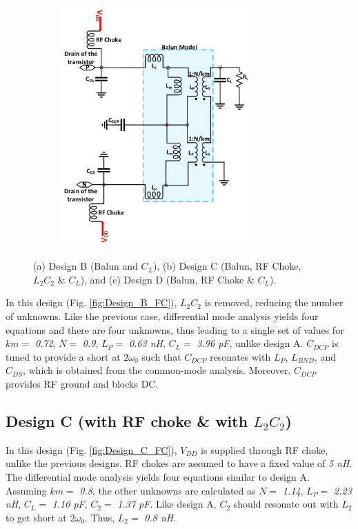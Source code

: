 \documentclass[conference]{IEEEtran}
\begin{document}
\begin{figure}[!t]
\begin{subfigure}{0.24\textwidth}
\includegraphics[width=0.8\textwidth]{Images/Design/Design_D_FC.jpg}
\caption{}
\label{fig:Design_D_FC}
\end{subfigure}
\caption{(a) Design B (Balun and $C_L$), (b) Design C (Balun, RF Choke, $L_2C_2$ \& $C_L$), and (c) Design D (Balun, RF Choke \& $C_L$).}
\label{fig:Design_B_C_D}
\vspace{-0.25in}
\end{figure}

In this design (Fig. \ref{fig:Design_B_FC}), $L_2C_2$ is removed, reducing the number of unknowns. Like the previous case, differential mode analysis yields four equations and there are four unknowns, thus leading to a single set of values for $km =$ \textit{0.72}, $N =$ \textit{0.9}, $L_P =$ \textit{0.63 nH}, $C_L =$ \textit{3.96 pF}, unlike design A. $C_{DCP}$ is tuned to provide a short at $2\omega_0$ such that $C_{DCP}$ resonates with $L_P$, $L_{BND}$, and $C_{DS}$, which is obtained from the common-mode analysis. Moreover, $C_{DCP}$ provides RF ground and blocks DC.

\subsection{Design C (with RF choke \& with $L_2C_2$)}
In this design (Fig. \ref{fig:Design_C_FC}), $V_{DD}$ is supplied through RF choke, unlike the previous designs. RF chokes are assumed to have a fixed value of \textit{5 nH}. The differential mode analysis yields four equations similar to design A. Assuming $km =$ \textit{0.8}, the other unknowns are calculated as $N =$ \textit{1.14}, $L_P =$ \textit{2.23 nH}, $C_L =$ \textit{1.10 pF}, $C_2 =$ \textit{1.37 pF}.
Like design A, $C_2$ should resonate out with $L_2$ to get short at $2\omega_0$. Thus, $L_2 =$ \textit{0.8 nH}. 
\end{document}
